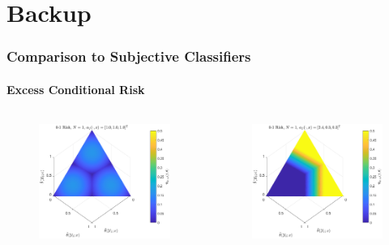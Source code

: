 \documentclass[aspectratio=169]{beamer}
\begin{document}
\section{Backup}


\begin{frame}
\frametitle{Comparison to Subjective Classifiers}
\framesubtitle{Excess Conditional Risk}

\vspace{-1em}
\begin{columns}[c]

\begin{column}{.5\linewidth}

\begin{figure}
\centering
\includegraphics[width=0.8\linewidth]{Risk_cond_ex_01_Dir_theta__uni_clim.pdf}
\label{fig:Risk_cond_ex_01_Dir_theta__uni}
\end{figure}

\end{column}

\begin{column}{.5\linewidth}

\begin{figure}
\centering
\includegraphics[width=0.8\linewidth]{Risk_cond_ex_01_Dir_theta__subj_clim.pdf}
\label{fig:Risk_cond_ex_01_Dir_theta__subj}
\end{figure}


\end{column}
\end{columns}
\end{frame}
\end{document}
